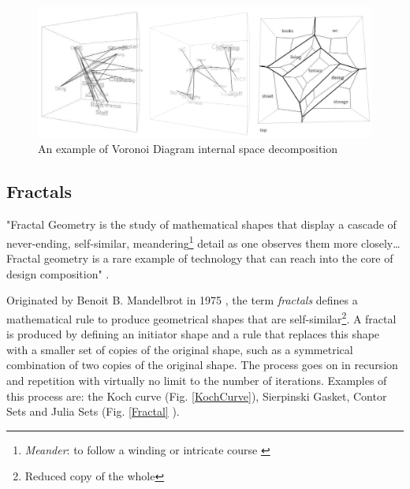 \begin{figure}[htbp]
\centering
\includegraphics[width=\textwidth]{./Images/8-StructureVoronoi}
\caption[Voronoi Diagram Space Decomposition]{An example of Voronoi Diagram internal space decomposition \cite{friedrich08}}
\label{VDInternal}
\end{figure}

\subsection{Fractals}

"Fractal Geometry is the study of mathematical shapes that display a cascade of never-ending, self-similar, meandering\footnote{\emph{Meander}: to follow a winding or intricate course \cite{merriam03}} detail as one observes them more closely\ldots Fractal geometry is a rare example of technology that can reach into the core of design composition" \cite{bovill96}.

Originated by Benoit B. Mandelbrot in 1975 \cite{fasoulaki08}, the term \emph{fractals} defines a mathematical rule to produce geometrical shapes that are self-similar\footnote{Reduced copy of the whole}. A fractal is produced by defining an initiator shape and a rule that replaces this shape with a smaller set of copies of the original shape, such as a symmetrical combination of two copies of the original shape. The process goes on in recursion and repetition with virtually no limit to the number of iterations. Examples of this process are: the Koch curve (Fig. \ref{KochCurve}), Sierpinski Gasket, Contor Sets and Julia Sets (Fig. \ref{Fractal} ).

